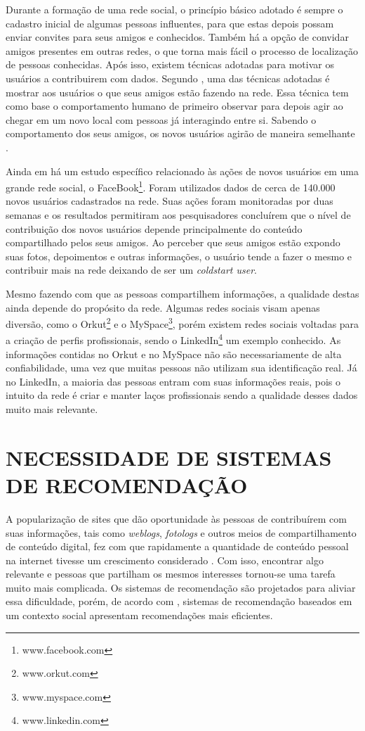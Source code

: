 Durante a formação de uma rede social, o princípio básico adotado é sempre o cadastro inicial de algumas pessoas influentes, para que estas depois possam enviar convites para seus amigos e conhecidos. Também há a opção de convidar amigos presentes em outras redes, o que torna mais fácil o processo de localização de pessoas conhecidas. Após isso, existem técnicas adotadas para motivar os usuários a contribuirem com dados. Segundo \cite{burke2009fmm}, uma das técnicas adotadas é mostrar aos usuários o que seus amigos estão fazendo na rede. Essa técnica tem como base o comportamento humano de primeiro observar para depois agir ao chegar em um novo local com pessoas já interagindo entre si. Sabendo o comportamento dos seus amigos, os novos usuários agirão de maneira semelhante \cite{burke2009fmm}.

Ainda em \cite{burke2009fmm} há um estudo específico relacionado às ações de novos usuários em uma grande rede social, o FaceBook\footnote{www.facebook.com}. Foram utilizados dados de cerca de 140.000 novos usuários cadastrados na rede. Suas ações foram monitoradas por duas semanas e os resultados permitiram aos pesquisadores concluírem que o nível de contribuição dos novos usuários depende principalmente do conteúdo compartilhado pelos seus amigos. Ao perceber que seus amigos estão expondo suas fotos, depoimentos e outras informações, o usuário tende a fazer o mesmo e contribuir mais na rede deixando de ser um \textit{coldstart user}.

Mesmo fazendo com que as pessoas compartilhem informações, a qualidade destas ainda depende do propósito da rede. Algumas redes sociais visam apenas diversão, como o Orkut\footnote{www.orkut.com} e o MySpace\footnote{www.myspace.com}, porém existem redes sociais voltadas para a criação de perfis profissionais, sendo o LinkedIn\footnote{www.linkedin.com} um exemplo conhecido. As informações contidas no Orkut e no MySpace não são necessariamente de alta confiabilidade, uma vez que muitas pessoas não utilizam sua identificação real. Já no LinkedIn, a maioria das pessoas entram com suas informações reais, pois o intuito da rede é criar e manter laços profissionais sendo a qualidade desses dados muito mais relevante.

\section{NECESSIDADE DE SISTEMAS DE RECOMENDAÇÃO}

A popularização de sites que dão oportunidade às pessoas de contribuírem com suas informações, tais como \textit{weblogs}, \textit{fotologs} e outros meios de compartilhamento de conteúdo digital, fez com que rapidamente a quantidade de conteúdo pessoal na internet tivesse um crescimento considerado \cite{bonhard2007devil}. Com isso, encontrar algo relevante e pessoas que partilham os mesmos interesses tornou-se uma tarefa muito mais complicada. Os sistemas de recomendação são projetados para aliviar essa dificuldade, porém, de acordo com \cite{bonhard2007devil}, sistemas de recomendação baseados em um contexto social apresentam recomendações mais eficientes.

